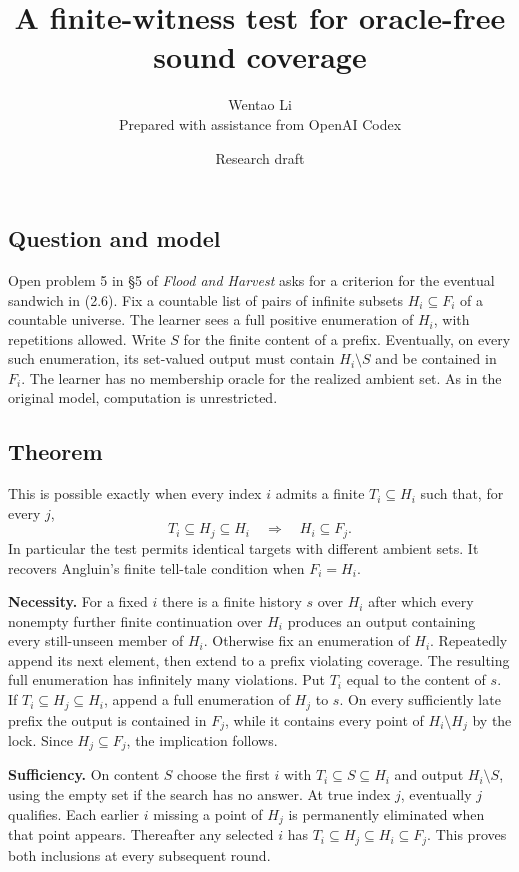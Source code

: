 \documentclass[11pt]{article}
\title{A finite-witness test for oracle-free sound coverage}
\author{Wentao Li\\{\small Prepared with assistance from OpenAI Codex}}
\date{Research draft}
\begin{document}
\maketitle
\subsection{Question and model}\label{question-and-model}

Open problem 5 in §5 of \emph{Flood and Harvest} asks for a criterion for the eventual sandwich in (2.6). Fix a countable list of pairs of infinite subsets \(H_i\subseteq F_i\) of a countable universe. The learner sees a full positive enumeration of \(H_i\), with repetitions allowed. Write \(S\) for the finite content of a prefix. Eventually, on every such enumeration, its set-valued output must contain \(H_i\setminus S\) and be contained in \(F_i\). The learner has no membership oracle for the realized ambient set. As in the original model, computation is unrestricted.

\subsection{Theorem}\label{theorem}

This is possible exactly when every index \(i\) admits a finite \(T_i\subseteq H_i\) such that, for every \(j\),
\[T_i\subseteq H_j\subseteq H_i\quad\Longrightarrow\quad H_i\subseteq F_j.\]
In particular the test permits identical targets with different ambient sets. It recovers Angluin's finite tell-tale condition when \(F_i=H_i\).

\textbf{Necessity.} For a fixed \(i\) there is a finite history \(s\) over \(H_i\) after which every nonempty further finite continuation over \(H_i\) produces an output containing every still-unseen member of \(H_i\). Otherwise fix an enumeration of \(H_i\). Repeatedly append its next element, then extend to a prefix violating coverage. The resulting full enumeration has infinitely many violations. Put \(T_i\) equal to the content of \(s\). If \(T_i\subseteq H_j\subseteq H_i\), append a full enumeration of \(H_j\) to \(s\). On every sufficiently late prefix the output is contained in \(F_j\), while it contains every point of \(H_i\setminus H_j\) by the lock. Since \(H_j\subseteq F_j\), the implication follows.

\textbf{Sufficiency.} On content \(S\) choose the first \(i\) with \(T_i\subseteq S\subseteq H_i\) and output \(H_i\setminus S\), using the empty set if the search has no answer. At true index \(j\), eventually \(j\) qualifies. Each earlier \(i\) missing a point of \(H_j\) is permanently eliminated when that point appears. Thereafter any selected \(i\) has \(T_i\subseteq H_j\subseteq H_i\subseteq F_j\). This proves both inclusions at every subsequent round.
\end{document}
